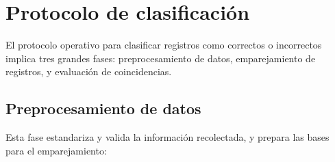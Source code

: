 \documentclass[
  12pt,
]{book}
\begin{document}
\section{Protocolo de clasificación}\label{protocolo-de-clasificaciuxf3n}

El protocolo operativo para clasificar registros como correctos o incorrectos implica tres grandes fases: preprocesamiento de datos, emparejamiento de registros, y evaluación de coincidencias.

\subsection{Preprocesamiento de datos}\label{preprocesamiento-de-datos}

Esta fase estandariza y valida la información recolectada, y prepara las bases para el emparejamiento:
\end{document}
